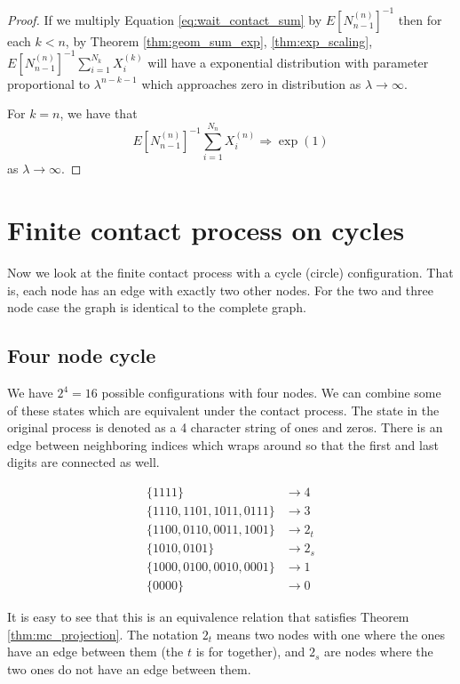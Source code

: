 \documentclass{article}
\theoremstyle{plain}
\theoremstyle{definition}
\theoremstyle{remark}
\numberwithin{equation}{section}
\begin{document}
\begin{proof}
If we multiply Equation \eqref{eq:wait_contact_sum} by $E[N_{n-1}^{(n)}]^{-1}$ then for each $k < n$, by Theorem \eqref{thm:geom_sum_exp}, \eqref{thm:exp_scaling}, $E[N_{n-1}^{(n)}]^{-1} \sum_{i = 
1}^{N_{k}} X_i^{(k)}$ will have a exponential distribution with parameter proportional to $\lambda^{n - k - 1}$ which approaches zero in distribution as $\lambda \to \infty$.

For $k = n$, we have that
$$
E[N_{n-1}^{(n)}]^{-1} \sum_{i = 
1}^{N_{n}} X_i^{(n)} \Rightarrow \exp(1)
$$
as $\lambda \to \infty$.
\end{proof}

\section{Finite contact process on cycles}

Now we look at the finite contact process with a cycle (circle) configuration.
That is, each node has an edge with exactly two other nodes.
For the two and three node case the graph is identical to the complete graph.

\subsection{Four node cycle}
We have $2^4 = 16$ possible configurations with four nodes.
We can combine some of these states which are equivalent under the contact process.
The state in the original process is denoted as a 4 character string of ones and zeros.
There is an edge between neighboring indices which wraps around so that the first and last digits are connected as well.

\begin{align*}
    \{1111\} &\to 4\\
    \{1110, 1101, 1011, 0111\} &\to 3\\
    \{1100, 0110, 0011, 1001\} &\to 2_t\\
    \{1010, 0101\} &\to 2_s\\
    \{1000, 0100, 0010, 0001\} &\to 1\\
    \{0000\} &\to 0
\end{align*}

It is easy to see that this is an equivalence relation that satisfies Theorem \ref{thm:mc_projection}.
The notation $2_t$ means two nodes with one where the ones have an edge between them (the $t$ is for together),
and $2_s$ are nodes where the two ones do not have an edge between them.
\end{document}
